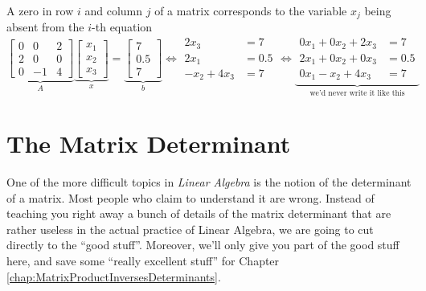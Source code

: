 \begin{tcolorbox}[sharp corners, colback=green!30, colframe=green!80!blue,title=\textbf{How to Handle ``Missing'' Variables or Coefficients}]
A zero in row $i$ and column $j$ of a matrix corresponds to the variable $x_j$ being absent from the $i$-th equation
\begin{equation}
\label{eq:Axeqb05}
\underbrace{\left[\begin{array}{rrr} 0 & 0 & 2\\
2 & 0 & 0 \\ 
0& -1 & 4\end{array}\right]}_{A} 
\underbrace{\left[\begin{array}{c} x_1\\ x_2 \\ x_3\end{array}\right]}_{x} =   \underbrace{\left[\begin{array}{c} 7\\ 0.5 \\ 7\end{array}\right]}_{b} \iff \begin{aligned}
2x_3 &=7 \\
2x_1&=0.5\\
-x_2 + 4 x_3 &=7
\end{aligned} \iff \underbrace{\begin{aligned}
0x_1 + 0 x_2 + 2x_3 &=7 \\
2x_1 + 0 x_2 + 0 x_3&=0.5\\
0 x_1 -x_2 + 4 x_3 &=7
\end{aligned}}_{\text{we'd never write it like this}} 
\end{equation}
\end{tcolorbox}


\section{The Matrix Determinant}

One of the more difficult topics in \textit{Linear Algebra} is the notion of the determinant of a matrix. Most people who claim to understand it are wrong. Instead of teaching you right away a bunch of details of the matrix determinant that are rather useless in the actual practice of Linear Algebra, we are going to cut directly to the ``good stuff''. Moreover, we'll only give you part of the good stuff here, and save some ``really excellent stuff'' for Chapter \ref{chap:MatrixProductInversesDeterminants}. 


